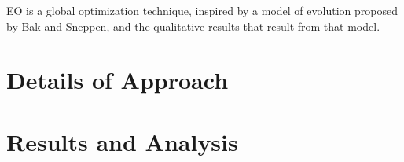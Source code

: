 \documentclass[12pt]{article}
\begin{document}
EO is a global optimization technique, inspired by a model of evolution proposed by Bak and Sneppen, and the qualitative results that result from that model. %




\section{Details of Approach}



\section{Results and Analysis}


\end{document}
